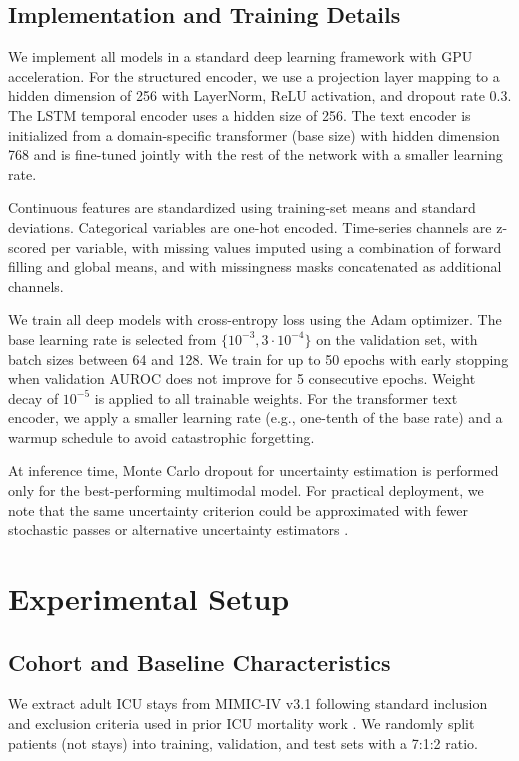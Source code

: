 \documentclass{article}
\begin{document}
\subsection{Implementation and Training Details}

We implement all models in a standard deep learning framework with GPU acceleration. 
 For the structured encoder, we use a projection layer mapping to a hidden dimension of 256 with LayerNorm, ReLU activation, and dropout rate 0.3. 
 The LSTM temporal encoder uses a hidden size of 256. 
 The text encoder is initialized from a domain-specific transformer (base size) with hidden dimension 768 and is fine-tuned jointly with the rest of the network with a smaller learning rate. 
 
 Continuous features are standardized using training-set means and standard deviations. 
 Categorical variables are one-hot encoded. 
 Time-series channels are z-scored per variable, with missing values imputed using a combination of forward filling and global means, and with missingness masks concatenated as additional channels.

We train all deep models with cross-entropy loss using the Adam optimizer.
The base learning rate is selected from $\{10^{-3}, 3\cdot10^{-4}\}$ on the validation set, with batch sizes between 64 and 128.
We train for up to 50 epochs with early stopping when validation AUROC does not improve for 5 consecutive epochs.
Weight decay of $10^{-5}$ is applied to all trainable weights.
For the transformer text encoder, we apply a smaller learning rate (e.g., one-tenth of the base rate) and a warmup schedule to avoid catastrophic forgetting.

At inference time, Monte Carlo dropout for uncertainty estimation is performed only for the best-performing multimodal model.
For practical deployment, we note that the same uncertainty criterion could be approximated with fewer stochastic passes or alternative uncertainty estimators \cite{Gal2016DropoutUncertainty}.

\section{Experimental Setup}

\subsection{Cohort and Baseline Characteristics}

We extract adult ICU stays from MIMIC-IV v3.1 following standard inclusion and exclusion criteria used in prior ICU mortality work \cite{Johnson2023MIMICIV,Pollard2018eICU,Hyland2020HiRID}.
We randomly split patients (not stays) into training, validation, and test sets with a 7:1:2 ratio.
\end{document}
